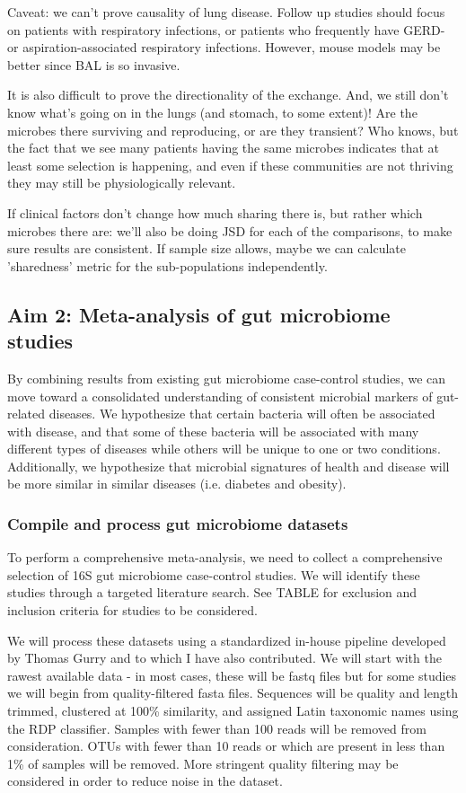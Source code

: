 \documentclass[12pt]{article}
\begin{document}
Caveat: we can't prove causality of lung disease. Follow up studies should focus on patients with respiratory infections, or patients who frequently have GERD- or aspiration-associated respiratory infections. However, mouse models may be better since BAL is so invasive.

It is also difficult to prove the directionality of the exchange. And, we still don't know what's going on in the lungs (and stomach, to some extent)! Are the microbes there surviving and reproducing, or are they transient? Who knows, but the fact that we see many patients having the same microbes indicates that at least some selection is happening, and even if these communities are not thriving they may still be physiologically relevant.

If clinical factors don't change how much sharing there is, but rather which microbes there are: we'll also be doing JSD for each of the comparisons, to make sure results are consistent. If sample size allows, maybe we can calculate 'sharedness' metric for the sub-populations independently.

\subsection{Aim 2: Meta-analysis of gut microbiome studies}
By combining results from existing gut microbiome case-control studies, we can move toward a consolidated understanding of consistent microbial markers of gut-related diseases. We hypothesize that certain bacteria will often be associated with disease, and that some of these bacteria will be associated with many different types of diseases while others will be unique to one or two conditions. Additionally, we hypothesize that microbial signatures  of health and disease will be more similar in similar diseases (i.e. diabetes and obesity).

\subsubsection{Compile and process gut microbiome datasets}
To perform a comprehensive meta-analysis, we need to collect a comprehensive selection of 16S gut microbiome case-control studies. We will identify these studies through a targeted literature search.  See TABLE for exclusion and inclusion criteria for studies to be considered.

We will process these datasets using a standardized in-house pipeline developed by Thomas Gurry and to which I have also contributed. We will start with the rawest available data - in most cases, these will be fastq files but for some studies we will begin from quality-filtered fasta files. Sequences will be quality and length trimmed, clustered at 100\% similarity, and assigned Latin taxonomic names using the RDP classifier. Samples with fewer than 100 reads will be removed from consideration. OTUs with fewer than 10 reads or which are present in less than 1\% of samples will be removed. More stringent quality filtering may be considered in order to reduce noise in the dataset.
\end{document}
